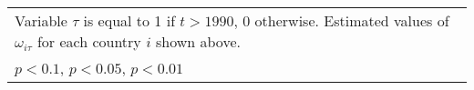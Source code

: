 \begin{table}[htbp]
\begin{tabular}{l*{3}{c}}
\multicolumn{4}{l}{\footnotesize Variable \(\tau\) is equal to 1 if \(t > 1990\), 0 otherwise. Estimated values of \(\omega_{i\tau}\) for each country \(i\) shown above.}\\
\multicolumn{4}{l}{\footnotesize \sym{*} \(p<0.1\), \sym{**} \(p<0.05\), \sym{***} \(p<0.01\)}\\
\end{tabular}
\end{table}
